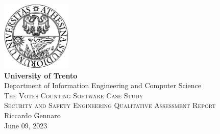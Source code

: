 \pagestyle{plain}

\thispagestyle{empty}

\begin{center}

  \includegraphics[width=0.25\textwidth]{I-initFolder/images/TrentoLOGO_2.png}\\[0.5cm]
  
  \textbf{\Large\textbf{University of Trento}}\\[0.5cm]
  
  Department of Information Engineering and Computer Science\\[4cm]
  
  \textsc{\huge The Votes Counting Software Case Study}\\[0.5cm]
  
  \textsc{Security and Safety Engineering Qualitative Assessment Report}\\[1.5cm]
  
  Riccardo Gennaro\\[0.5cm] 
  
  {June 09, 2023}

\end{center}